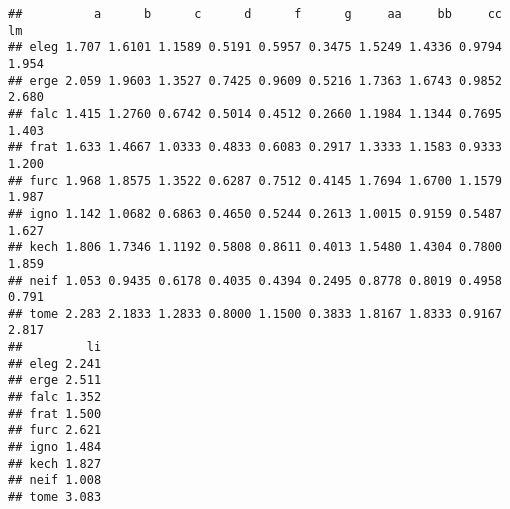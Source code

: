 \begin{knitrout}
\color{fgcolor}\begin{kframe}
\begin{flushleft}
\ttfamily\noindent
{}\hlkeyword{(}\hlkeyword{(}\hlkeyword{(}\hlkeyword{,}{\ }\hlkeyword{)}\hlkeyword{)}\hlkeyword{)}\mbox{}
\normalfont
\end{flushleft}
\begin{verbatim}
##          a      b      c      d      f      g     aa     bb     cc    lm
## eleg 1.707 1.6101 1.1589 0.5191 0.5957 0.3475 1.5249 1.4336 0.9794 1.954
## erge 2.059 1.9603 1.3527 0.7425 0.9609 0.5216 1.7363 1.6743 0.9852 2.680
## falc 1.415 1.2760 0.6742 0.5014 0.4512 0.2660 1.1984 1.1344 0.7695 1.403
## frat 1.633 1.4667 1.0333 0.4833 0.6083 0.2917 1.3333 1.1583 0.9333 1.200
## furc 1.968 1.8575 1.3522 0.6287 0.7512 0.4145 1.7694 1.6700 1.1579 1.987
## igno 1.142 1.0682 0.6863 0.4650 0.5244 0.2613 1.0015 0.9159 0.5487 1.627
## kech 1.806 1.7346 1.1192 0.5808 0.8611 0.4013 1.5480 1.4304 0.7800 1.859
## neif 1.053 0.9435 0.6178 0.4035 0.4394 0.2495 0.8778 0.8019 0.4958 0.791
## tome 2.283 2.1833 1.2833 0.8000 1.1500 0.3833 1.8167 1.8333 0.9167 2.817
##         li
## eleg 2.241
## erge 2.511
## falc 1.352
## frat 1.500
## furc 2.621
## igno 1.484
## kech 1.827
## neif 1.008
## tome 3.083
\end{verbatim}
\end{kframe}
\end{knitrout}

